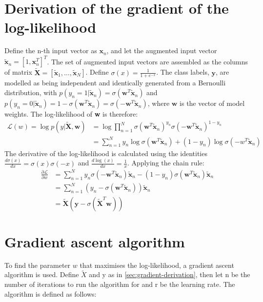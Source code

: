 \documentclass[a4paper]{article}
\begin{document}
    \section{Derivation of the gradient of the log-likelihood}\label{sec:gradient-derivation}
    Define the n-th input vector as $\textbf{x}_n$, and let the augmented input vector
    $\tilde{\textbf{x}}_n = \left[1, \textbf{x}_n^T \right]^T$.
    The set of augmented input vectors are assembled as the columns of matrix
    $\tilde{\textbf{X}} = [\tilde{\textbf{x}}_1, \dots, \tilde{\textbf{x}}_N]$.
    Define $\sigma(x) = \frac{1}{1 + e^{-x}}$.
    The class labels, $\textbf{y}$, are modelled as being independent and identically generated from a Bernoulli
    distribution, with $p (y_n = 1 | \tilde{\textbf{x}}_n ) = \sigma (\textbf{w}^T\tilde{\textbf{x}}_n)$ and
    $p (y_n = 0 | \tilde{\textbf{x}}_n ) = 1 - \sigma (\textbf{w}^T\tilde{\textbf{x}}_n) = \sigma (-\textbf{w}^T\tilde{\textbf{x}}_n)$,
    where $\textbf{w}$ is the vector of model weights.
    The log-likelihood of \textbf{w} is therefore:
    \begin{align*}
        \mathcal{L}(w) = \log p(y|\tilde{\textbf{X}}, \textbf{w})
        &= \log \prod_{n=1}^{N} \sigma( \textbf{w}^T \tilde{\textbf{x}}_n)^{y_n}
        \sigma (-\textbf{w}^T \tilde{\textbf{x}}_n)^{1-y_n} \\
        &= \sum_{n=1}^{N} y_n \log\sigma( \textbf{w}^T \tilde{\textbf{x}}_n) + (1-y_n) \log\sigma(-w^T \tilde{\textbf{x}}_n)
    \end{align*}
    The derivative of the log-likelihood is calculated using the identities $\frac{d\sigma(x)}{dx} = \sigma(x)\sigma(-x)$
    and $\frac{d\log(x)}{dx} = \frac{1}{x}$. Applying the chain rule:
    \begin{align*}
        \frac{\partial \mathcal{L}}{\partial w}
        &= \sum_{n=1}^{N} y_n \sigma(-\textbf{w}^T \tilde{\textbf{x}}_n) \tilde{\textbf{x}}_n - (1-y_n) \sigma(\textbf{w}^T \tilde{\textbf{x}}_n)  \tilde{\textbf{x}}_n \\
        &= \sum_{n=1}^{N} \left(y_n - \sigma(\textbf{w}^T \tilde{\textbf{x}}_n) \right)  \tilde{\textbf{x}}_n \\
        &= \tilde{\textbf{X}} (\textbf{y} - \sigma(\tilde{\textbf{X}}^T \textbf{w}))
    \end{align*}

    \section{Gradient ascent algorithm}\label{sec:gradient-ascent-algorithm}
    To find the parameter $w$ that maximises the log-likelihood, a gradient ascent algorithm is used. Define
    $\tilde{X}$ and y as in \autoref{sec:gradient-derivation}, then let n be the number of iterations to run the
    algorithm for and r be the learning rate. The algorithm is defined as follows:
\end{document}
